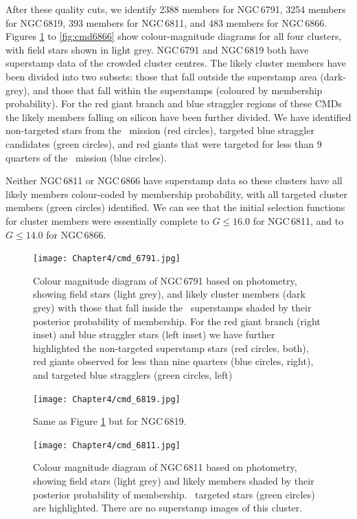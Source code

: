 After these quality cuts, we identify 2388 members for NGC\,6791, 3254 members for NGC\,6819, 393 members for NGC\,6811, and 483 members for NGC\,6866. Figures \ref{fig:cmd6791} to \ref{fig:cmd6866} show colour-magnitude diagrams for all four clusters, with field stars shown in light grey. 
NGC\,6791 and NGC\,6819 both have superstamp data of the crowded cluster centres. The likely cluster members have been divided into two subsets: those that fall outside the superstamp area (dark-grey), and those that fall within the superstamps (coloured by membership probability). For the red giant branch and blue straggler regions of these CMDs the likely members falling on silicon have been further divided. We have identified non-targeted stars from the \Kepler~mission (red circles), targeted blue straggler candidates (green circles), and red giants that were targeted for less than 9 quarters of the \Kepler~mission (blue circles). 

Neither NGC\,6811 or NGC\,6866 have superstamp data so these clusters have all likely members colour-coded by membership probability, with all targeted cluster members (green circles) identified. We can see that the initial selection functions for cluster members were essentially complete to $G\leq16.0$ for NGC\,6811, and to $G\leq14.0$ for NGC\,6866.

\begin{figure}[hbtp]
\centering
\texttt{[image: Chapter4/cmd\_6791.jpg]}
\caption[NGC\,6791 CMD]{Colour magnitude diagram of NGC\,6791 based on \Gaia{} photometry, showing field stars (light grey), and likely cluster members (dark grey) with those that fall inside the \Kepler~superstamps shaded by their posterior probability of membership. For the red giant branch (right inset) and blue straggler stars (left inset) we have further highlighted the non-targeted superstamp stars (red circles, both), red giants observed for less than nine quarters (blue circles, right), and targeted blue stragglers (green circles, left)} %
\label{fig:cmd6791}
\end{figure}

\begin{figure}[hbtp]
\centering
\texttt{[image: Chapter4/cmd\_6819.jpg]}
\caption[NGC\,6819 CMD]{Same as Figure \ref{fig:cmd6791} but for NGC\,6819.} %
\label{fig:cmd6819}
\end{figure}

\begin{figure}[hbtp]
\centering
\texttt{[image: Chapter4/cmd\_6811.jpg]}
\caption[NGC\,6811 CMD]{Colour magnitude diagram of NGC\,6811 based on \Gaia{} photometry, showing field stars (light grey) and likely members shaded by their posterior probability of membership. \Kepler~targeted stars (green circles) are highlighted. There are no superstamp images of this cluster.}
\label{fig:cmd6811}
\end{figure} %

